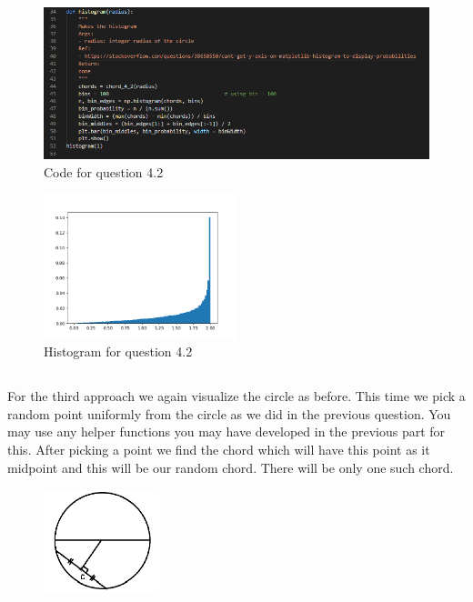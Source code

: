 \documentclass[answers]{exam}
\begin{document}
\begin{framed}
\begin{figure}[H] %
    \centering
    \includegraphics[width= 1\textwidth]{Q4.2_code_2.PNG}
    \caption{Code for question 4.2}
\end{figure}


\begin{figure}[H] %
    \centering
    \includegraphics[width= 0.5\textwidth]{Q4.2_histogram.png}
    \caption{Histogram for question 4.2}
\end{figure}


\end{framed}


\subsection{} For the third approach we again visualize the circle as before. This time we pick a random point uniformly from the circle as we did in the previous question. You may use any helper functions you may have developed in the previous part for this. After picking a point we find the chord which will have this point as it midpoint and this will be our random chord. There will be only one such chord. 

\begin{figure}[H] %
    \centering
    \includegraphics[width= 0.3\textwidth]{Q4.3.PNG}
\end{figure}
\end{document}
